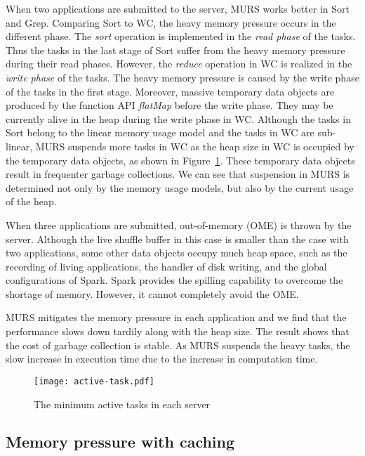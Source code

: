 When two applications are submitted to the server, MURS works better in Sort and Grep. Comparing Sort to WC, the heavy memory pressure occurs in the different phase. The \textit{sort} operation is implemented in the \textit{read phase} of the tasks. Thus the tasks in the last stage of Sort suffer from the heavy memory pressure during their read phases. However, the \textit{reduce} operation in WC is realized in the \textit{write phase} of the tasks. The heavy memory pressure is caused by the write phase of the tasks in the first stage. Moreover, massive temporary data objects are produced by the function API \textit{flatMap} before the write phase. They may be currently alive in the heap during the write phase in WC. Although the tasks in Sort belong to the linear memory usage model and the tasks in WC are sub-linear, MURS suspends more tasks in WC as the heap size in WC is occupied by the temporary data objects, as shown in Figure~\ref{fig:active-task}. These temporary data objects result in frequenter garbage collections. We can see that suspension in MURS is determined not only by the memory usage models, but also by the current usage of the heap. 

When three applications are submitted, out-of-memory (OME) is thrown by the server. Although the live shuffle buffer in this case is smaller than the case with two applications, some other data objects occupy much heap space, such as the recording of living applications, the handler of disk writing, and the global configurations of Spark. Spark provides the spilling capability to overcome the shortage of memory. However, it cannot completely avoid the OME.

MURS mitigates the memory pressure in each application and we find that the performance slows down tardily along with the heap size. The result shows that the cost of garbage collection is stable. As MURS suspends the heavy tasks, the slow increase in execution time due to the increase in computation time.  

\begin{figure}[!t]
\centering
\texttt{[image: active-task.pdf]}
\caption{The minimum active tasks in each server}
\label{fig:active-task}
\end{figure}

\subsection{Memory pressure with caching}

